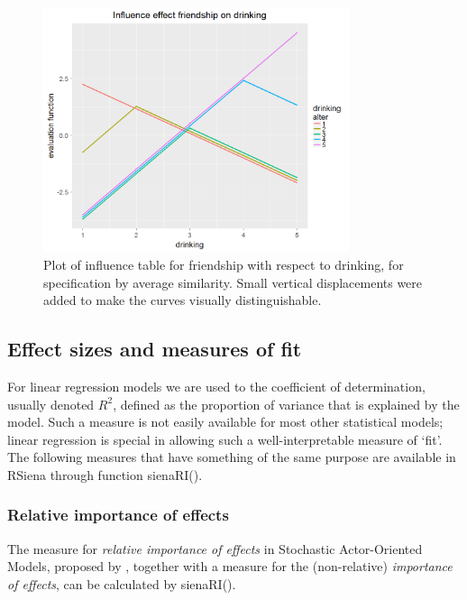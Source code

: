 \documentclass[a4paper,fleqn,11pt]{article}
\newcommand{\+}{\, + \,}
\newcommand{\sfn}[1]{\textsf{#1}}
\newcommand{\RS}{{\sf RSiena }}
\newcommand{\saom}{{Stochastic Actor-Oriented Model}}
\begin{document}
\begin{figure}[hb]
  \centering
  \includegraphics[width=0.8\textwidth]{influenceTable_s_drinking.png}
  \caption{Plot of influence table  for friendship with respect to drinking,\protect\newline
  for specification by average similarity.
  \protect\newline Small vertical displacements
  were added to make the curves visually distinguishable.}
  \label{F_infl_dk_avsim}
\end{figure}

\clearpage

\subsection{Effect sizes and measures of fit}

For linear regression models we are used to the coefficient of determination,
usually denoted $R^2$, defined as the proportion of variance
that is explained by the model.
Such a measure is not easily available for most other statistical models;
linear regression is special in allowing such a well-interpretable
measure of `fit'.
The following measures that have something of the same purpose
are available in \RS through function  \sfn{sienaRI()}.

\subsubsection{Relative importance of effects}

The measure for \emph{relative importance of effects} in {\saom}s,
proposed by \citet{IndlekoferBrandes2013},
together with a measure for the (non-relative) \emph{importance of effects},
can be calculated by \sfn{sienaRI()}.
\end{document}
